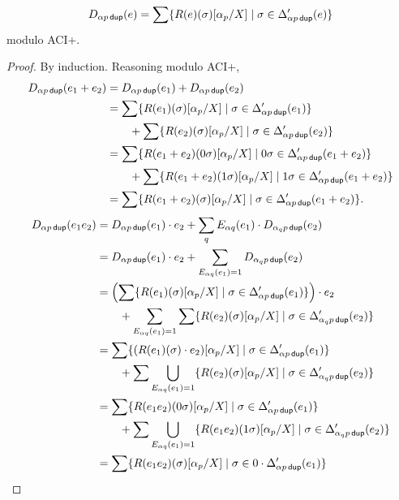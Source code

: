 \documentclass{article}
\newcommand\pdup{\mathop{\mathsf{dup}}}
\begin{document}
\begin{lemma}
\label{eq:BDelta}
\begin{align*}
D_{\alpha p\pdup}(e) = \sum\set{\rep\sigma e\subst{\alpha_p}X}{\sigma\in\Delta'_{\alpha p\pdup}(e)}
\end{align*}
modulo ACI+.
\end{lemma}
\begin{proof}
By induction. Reasoning modulo ACI+,
\begin{align*}
D_{\alpha p\pdup}(e_1+e_2) &= D_{\alpha p\pdup}(e_1) + D_{\alpha p\pdup}(e_2)\\
&= \sum\set{\rep\sigma{e_1}\subst{\alpha_p}X}{\sigma\in\Delta'_{\alpha p\pdup}(e_1)}\\
& \qquad + \sum\set{\rep\sigma{e_2}\subst{\alpha_p}X}{\sigma\in\Delta'_{\alpha p\pdup}(e_2)}\\
&= \sum\set{\rep{0\sigma}{e_1+e_2}\subst{\alpha_p}X}{0\sigma\in\Delta'_{\alpha p\pdup}(e_1+e_2)}\\
& \qquad + \sum\set{\rep{1\sigma}{e_1+e_2}\subst{\alpha_p}X}{1\sigma\in\Delta'_{\alpha p\pdup}(e_1+e_2)}\\
&= \sum\set{\rep{\sigma}{e_1+e_2}\subst{\alpha_p}X}{\sigma\in\Delta'_{\alpha p\pdup}(e_1+e_2)}.
\end{align*}
\begin{align*}
D_{\alpha p\pdup}(e_1e_2) &= D_{\alpha p\pdup}(e_1)\cdot e_2 + \sum_q E_{\alpha q}(e_1)\cdot D_{\alpha_qp\pdup}(e_2)\\
&= D_{\alpha p\pdup}(e_1)\cdot e_2 + \sum_{E_{\alpha q}(e_1)=1} D_{\alpha_qp\pdup}(e_2)\\
&= \left(\sum\set{\rep\sigma{e_1}\subst{\alpha_p}X}{\sigma\in\Delta'_{\alpha p\pdup}(e_1)}\right)\cdot e_2\\
& \qquad + \sum_{E_{\alpha q}(e_1)=1}\sum\set{\rep\sigma{e_2}\subst{\alpha_p}X}{\sigma\in\Delta'_{\alpha_qp\pdup}(e_2)}\\
&= \sum\set{(\rep\sigma{e_1}\cdot e_2)\subst{\alpha_p}X}{\sigma\in\Delta'_{\alpha p\pdup}(e_1)}\\
& \qquad + \sum\bigcup_{E_{\alpha q}(e_1)=1}\set{\rep\sigma{e_2}\subst{\alpha_p}X}{\sigma\in\Delta'_{\alpha_qp\pdup}(e_2)}\\
&= \sum\set{\rep{0\sigma}{e_1e_2}\subst{\alpha_p}X}{\sigma\in\Delta'_{\alpha p\pdup}(e_1)}\\
& \qquad + \sum\bigcup_{E_{\alpha q}(e_1)=1}\set{\rep{1\sigma}{e_1e_2}\subst{\alpha_p}X}{\sigma\in\Delta'_{\alpha_qp\pdup}(e_2)}\\
&= \sum\set{\rep{\sigma}{e_1e_2}\subst{\alpha_p}X}{\sigma\in 0\cdot\Delta'_{\alpha p\pdup}(e_1)}\\

\end{align*}
\end{proof}
\end{document}
